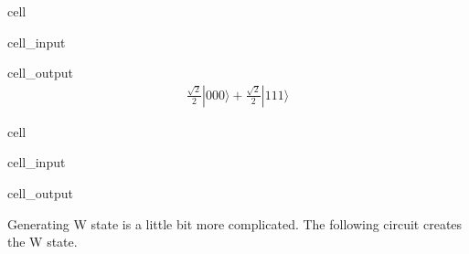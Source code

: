 \documentclass[letterpaper,10pt,english]{jupyterBook}
\begin{document}
\begin{sphinxuseclass}{cell}\begin{sphinxVerbatimInput}

\begin{sphinxuseclass}{cell_input}
\begin{sphinxVerbatim}[commandchars=\\\{\}]
   

\end{sphinxVerbatim}

\end{sphinxuseclass}\end{sphinxVerbatimInput}
\begin{sphinxVerbatimOutput}

\begin{sphinxuseclass}{cell_output}\begin{equation*}
\begin{split}\frac{\sqrt{2}}{2} |000\rangle+\frac{\sqrt{2}}{2} |111\rangle\end{split}
\end{equation*}
\end{sphinxuseclass}\end{sphinxVerbatimOutput}

\end{sphinxuseclass}
\begin{sphinxuseclass}{cell}\begin{sphinxVerbatimInput}

\begin{sphinxuseclass}{cell_input}
\begin{sphinxVerbatim}[commandchars=\\\{\}]
   
\end{sphinxVerbatim}

\end{sphinxuseclass}\end{sphinxVerbatimInput}
\begin{sphinxVerbatimOutput}

\begin{sphinxuseclass}{cell_output}
\noindent{}

\end{sphinxuseclass}\end{sphinxVerbatimOutput}

\end{sphinxuseclass}
\sphinxAtStartPar
Generating W state is a little bit more complicated. The following circuit
creates the W state.
\end{document}

